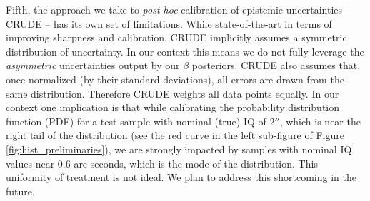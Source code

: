 


Fifth, the approach we take to {\it post-hoc} calibration of epistemic uncertainties -- CRUDE \citep{crude_probability_calibration} -- has its own set of limitations. While state-of-the-art in terms of improving sharpness and calibration, CRUDE implicitly assumes a symmetric distribution of uncertainty.  In our context this means we do not fully leverage the {\it asymmetric} uncertainties output by our $\beta$ posteriors. CRUDE also assumes that, once normalized (by their standard deviations), all  errors are drawn from the same distribution.  Therefore CRUDE weights all data points equally. In our context one implication is that while calibrating the probability distribution function (PDF) for a test sample with nominal (true) IQ of $2''$, which is near the right tail of the distribution (see the red curve in the left sub-figure of Figure \ref{fig:hist_preliminaries}), we are strongly impacted by samples with nominal IQ values near 0.6 arc-seconds, which is the mode of the distribution. This uniformity of treatment is not ideal. We plan to address this shortcoming in the future.

